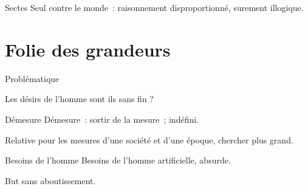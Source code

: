 \documentclass{beamer}
\begin{document}
\begin{frame}{Sectes}
  Seul contre le monde~: raisonnement disproportionné, surement illogique.
\end{frame}

\section{Folie des grandeurs}

\begin{frame}{Problématique}
  \begin{center}
    Les désirs de l'homme sont ils sans fin ?  
  \end{center}
\end{frame}

\begin{frame}{Démesure}
  Démesure~: sortir de la mesure~; indéfini.
  
  Relative pour les mesures d'une société et d'une époque, chercher plus grand.
\end{frame}

\begin{frame}{Besoins de l'homme}
  Besoins de l'homme artificielle, absurde.
  
  But sans aboutissement.
\end{frame}
\end{document}
